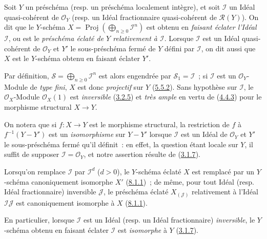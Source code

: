 \begin{definition}[8.1.3]
\label{II.8.1.3-fr}
Soit $Y$ un préschéma (resp. un préschéma localement intègre), et soit
$\mathcal{I}$ un Idéal quasi-cohérent de $\mathcal{O}_Y$ (resp. un Idéal
fractionnaire quasi-cohérent de $\mathcal{R}(Y)$). On dit que le $Y$-schéma
$X=\operatorname{Proj}(\bigoplus_{n\geq0}\mathcal{I}^n)$ est obtenu en
\emph{faisant éclater l'Idéal $\mathcal{I}$}, ou est le \emph{préschéma éclaté
de $Y$ relativement à $\mathcal{I}$}. Lorsque $\mathcal{I}$ est un Idéal
quasi-cohérent de $\mathcal{O}_Y$ et $Y'$ le sous-préschéma fermé de $Y$ défini
par $\mathcal{I}$, on dit aussi que $X$ est le $Y$-schéma obtenu en faisant
éclater $Y'$.
\end{definition}

Par définition, $\mathcal{S}=\bigoplus_{n\geq0}\mathcal{I}^n$ est alors
engendrée par $\mathcal{S}_1=\mathcal{I}$~; si $\mathcal{I}$ est un
$\mathcal{O}_Y$-Module de \emph{type fini}, $X$ est donc \emph{projectif} sur
$Y$ (\hyperref[II.5.5.2-fr]{5.5.2}). Sans hypothèse sur $\mathcal{I}$, le
$\mathcal{O}_X$-Module $\mathcal{O}_X(1)$ est \emph{inversible}
(\hyperref[II.3.2.5-fr]{3.2.5}) et \emph{très ample} en vertu de
(\hyperref[II.4.4.3-fr]{4.4.3}) pour le morphisme structural $X\to Y$.

On notera que si $f:X\to Y$ est le morphisme structural, la restriction de
$f$ à $f^{-1}(Y-Y')$ est un \emph{isomorphisme} sur $Y-Y'$ lorsque
$\mathcal{I}$ est un Idéal de $\mathcal{O}_Y$ et $Y'$ le sous-préschéma fermé
qu'il définit~: en effet, la question étant locale sur $Y$, il suffit de
supposer $\mathcal{I}=\mathcal{O}_Y$, et notre assertion résulte de
(\hyperref[II.3.1.7-fr]{3.1.7}).

Lorsqu'on remplace $\mathcal{I}$ par $\mathcal{I}^d$ ($d>0$), le $Y$-schéma
éclaté $X$ est remplacé par un $Y$-schéma canoniquement isomorphe $X'$
(\hyperref[II.8.1.1-fr]{8.1.1})~; de même, pour tout Idéal (resp. Idéal
fractionnaire) inversible $\mathcal{J}$, le préschéma éclaté
$X_{(\mathcal{J})}$ relativement à l'Idéal $\mathcal{I}\mathcal{J}$ est
canoniquement isomorphe à $X$ (\hyperref[II.8.1.1-fr]{8.1.1}).

En particulier, lorsque $\mathcal{I}$ est un Idéal (resp. un Idéal
fractionnaire) \emph{inversible}, le $Y$-schéma obtenu en faisant éclater
$\mathcal{I}$ est \emph{isomorphe} à $Y$ (\hyperref[II.3.1.7-fr]{3.1.7}).

